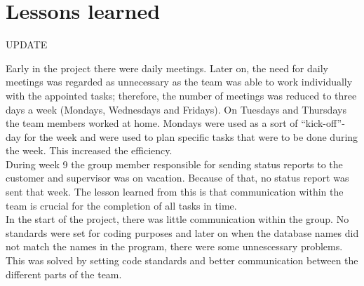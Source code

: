 \section{Lessons learned}

UPDATE

Early in the project there were daily meetings. Later on, the need for daily meetings was regarded as unnecessary as the team was able to work individually with the appointed tasks; therefore, the number of meetings was reduced to three days a week (Mondays, Wednesdays and Fridays). On Tuesdays and Thursdays the team members worked at home. Mondays were used as a sort of “kick-off”-day for the week and were used to plan specific tasks that were to be done during the week. This increased the efficiency.\\
\newline
During week 9 the group member responsible for sending status reports to the customer and supervisor was on vacation. Because of that, no status report was sent that week. The lesson learned from this is that communication within the team is crucial for the completion of all tasks in time.\\
\newline
In the start of the project, there was little communication within the group. No standards were set
for coding purposes and later on when the database names did not match the names in the program, there were some unnescessary problems. This was solved by setting code standards and better communication between the different 
parts of the team. \\
